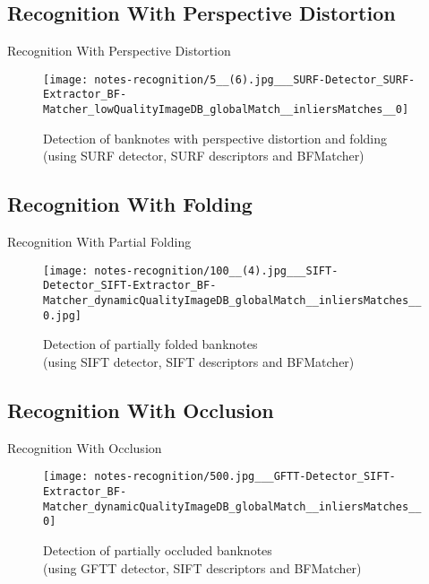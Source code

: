 \subsection*{Recognition With Perspective Distortion}
\begin{frame}{Recognition With Perspective Distortion}
	\begin{figure}[H]
		\centering
		\texttt{[image: notes-recognition/5\_\_(6).jpg\_\_\_SURF-Detector\_SURF-Extractor\_BF-Matcher\_lowQualityImageDB\_globalMatch\_\_inliersMatches\_\_0]}
		\caption{Detection of banknotes with perspective distortion and folding (using SURF detector, SURF descriptors and BFMatcher)}
		\label{fig:recognition-perspective-distortion}
	\end{figure}
\end{frame}


\subsection*{Recognition With Folding}
\begin{frame}{Recognition With Partial Folding}
	\begin{figure}[H]
		\centering
		\texttt{[image: notes-recognition/100\_\_(4).jpg\_\_\_SIFT-Detector\_SIFT-Extractor\_BF-Matcher\_dynamicQualityImageDB\_globalMatch\_\_inliersMatches\_\_0.jpg]}
		\caption{Detection of partially folded banknotes\\(using SIFT detector, SIFT descriptors and BFMatcher)}
		\label{fig:recognition-folding}
	\end{figure}
\end{frame}


\subsection*{Recognition With Occlusion}
\begin{frame}{Recognition With Occlusion}
	\begin{figure}[H]
		\centering
		\texttt{[image: notes-recognition/500.jpg\_\_\_GFTT-Detector\_SIFT-Extractor\_BF-Matcher\_dynamicQualityImageDB\_globalMatch\_\_inliersMatches\_\_0]}
		\caption{Detection of partially occluded banknotes\\(using GFTT detector, SIFT descriptors and BFMatcher)}
		\label{fig:recognition-partially-occluded-banknotes}
	\end{figure}
\end{frame}


